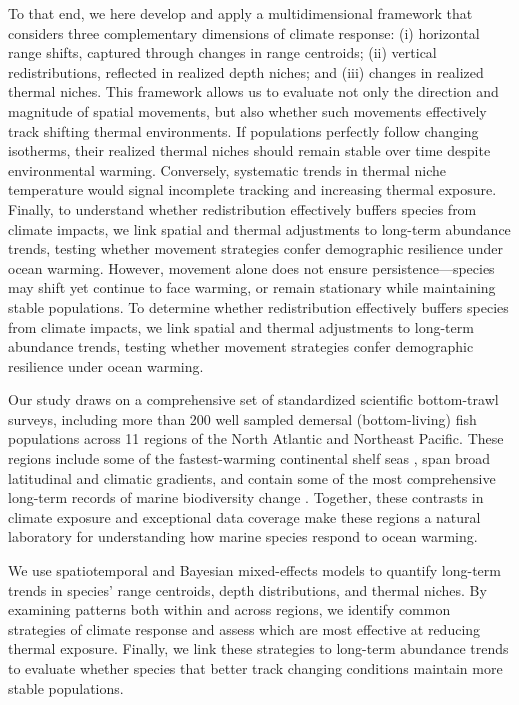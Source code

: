 \documentclass[lineno,pdflatex,sn-nature]{sn-jnl}%
\theoremstyle{thmstyleone}%
\theoremstyle{thmstyletwo}%
\theoremstyle{thmstylethree}%
\begin{document}
To that end, we here develop and apply a multidimensional framework that considers three complementary dimensions of climate response: (i) horizontal range shifts, captured through changes in range centroids; (ii) vertical redistributions, reflected in realized depth niches; and
(iii) changes in realized thermal niches. This framework allows us to evaluate not only the direction and magnitude of spatial movements, but also whether such movements effectively track shifting thermal environments. If populations perfectly follow changing isotherms, their realized thermal niches should remain stable over time despite environmental warming. Conversely, systematic trends in thermal niche temperature would signal incomplete tracking and increasing thermal exposure.
Finally, to understand whether redistribution effectively buffers species from climate impacts, we link spatial and thermal adjustments to long-term abundance trends, testing whether movement strategies confer demographic resilience under ocean warming.
However, movement alone does not ensure persistence—species may shift yet continue to face warming, or remain stationary while maintaining stable populations. To determine whether redistribution effectively buffers species from climate impacts, we link spatial and thermal adjustments to long-term abundance trends, testing whether movement strategies confer demographic resilience under ocean warming.

Our study draws on a comprehensive set of standardized scientific bottom-trawl surveys, including more than 200 well sampled demersal (bottom-living) fish populations across 11 regions of the North Atlantic and Northeast Pacific. These regions include some of the fastest-warming continental shelf seas \citep{pershing_slow_2015, song_arctic_2023}, span broad latitudinal and climatic gradients, and contain some of the most comprehensive long-term records of marine biodiversity change \citep{maureaud_are_2021, maureaud_fishglob_data_2024}. Together, these contrasts in climate exposure and exceptional data coverage make these regions a natural laboratory for understanding how marine species respond to ocean warming.

We use spatiotemporal and Bayesian mixed-effects models to quantify long-term trends in species’ range centroids, depth distributions, and thermal niches. By examining patterns both within and across regions, we identify common strategies of climate response and assess which are most effective at reducing thermal exposure. Finally, we link these strategies to long-term abundance trends to evaluate whether species that better track changing conditions maintain more stable populations.
\end{document}
